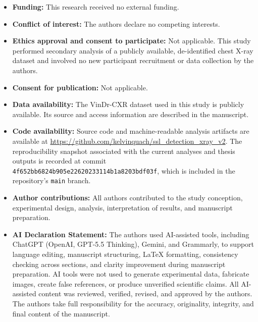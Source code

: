 \documentclass[pdflatex,sn-mathphys-num]{sn-jnl}%
\theoremstyle{thmstyleone}%
\theoremstyle{thmstyletwo}%
\theoremstyle{thmstylethree}%
\begin{document}
\begin{itemize}

\item \textbf{Funding:} This research received no external funding.

\item \textbf{Conflict of interest:} The authors declare no competing interests.

\item \textbf{Ethics approval and consent to participate:}
Not applicable. This study performed secondary analysis of a publicly available, de-identified chest X-ray dataset and involved no new participant recruitment or data collection by the authors.

\item \textbf{Consent for publication:} Not applicable.

\item \textbf{Data availability:} The VinDr-CXR dataset used in this study is publicly available. Its source and access information are described in the manuscript.

\item \textbf{Code availability:} Source code and machine-readable analysis artifacts are available at
\url{https://github.com/kelvinquach/ssl_detection_xray_v2}.
The reproducibility snapshot associated with the current analyses and thesis outputs is recorded at commit
\texttt{4f652bb6824b905e22620233114b1a8203bdf03f},
which is included in the repository's \texttt{main} branch.

\item \textbf{Author contributions:} All authors contributed to the study conception, experimental design, analysis, interpretation of results, and manuscript preparation.

\item \textbf{AI Declaration Statement:} The authors used AI-assisted tools, including ChatGPT (OpenAI, GPT-5.5 Thinking), Gemini, and Grammarly, to support language editing, manuscript structuring, LaTeX formatting, consistency checking across sections, and clarity improvement during manuscript preparation. AI tools were not used to generate experimental data, fabricate images, create false references, or produce unverified scientific claims. All AI-assisted content was reviewed, verified, revised, and approved by the authors. The authors take full responsibility for the accuracy, originality, integrity, and final content of the manuscript.

\end{itemize}

\FloatBarrier
\clearpage


\end{document}
